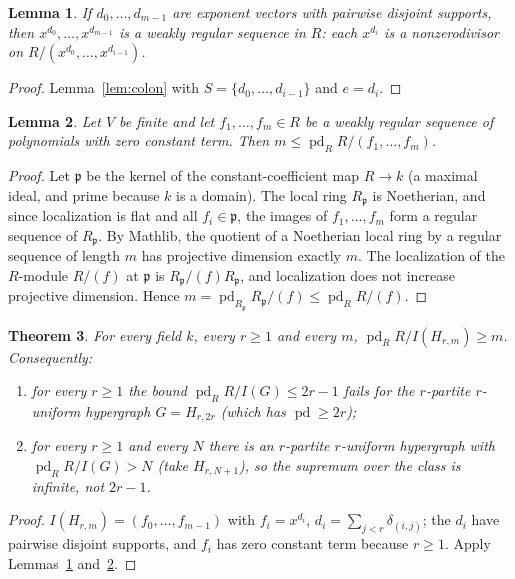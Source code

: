\documentclass[11pt]{article}
\newtheorem{theorem}{Theorem}
\newtheorem{lemma}[theorem]{Lemma}
\theoremstyle{definition}
\theoremstyle{remark}
\renewcommand{\_}{\oldus\allowbreak}
\newcommand{\pd}{\operatorname{pd}}
\begin{document}
\begin{lemma}\label{lem:reg}
If $d_0,\dots,d_{m-1}$ are exponent vectors with pairwise disjoint supports, then
$x^{d_0},\dots,x^{d_{m-1}}$ is a weakly regular sequence in $R$: each $x^{d_i}$ is a
nonzerodivisor on $R/(x^{d_0},\dots,x^{d_{i-1}})$.
\end{lemma}
\begin{proof}
Lemma~\ref{lem:colon} with $S=\{d_0,\dots,d_{i-1}\}$ and $e=d_i$.
\end{proof}

\begin{lemma}\label{lem:pd}
Let $V$ be finite and let $f_1,\dots,f_m\in R$ be a weakly regular sequence of polynomials with zero
constant term. Then $m\le\pd_R R/(f_1,\dots,f_m)$.
\end{lemma}
\begin{proof}
Let $\mathfrak p$ be the kernel of the constant-coefficient map $R\to k$ (a maximal ideal, and
prime because $k$ is a domain). The local ring $R_{\mathfrak p}$ is Noetherian, and since localization
is flat and all $f_i\in\mathfrak p$, the images of $f_1,\dots,f_m$ form a regular sequence of
$R_{\mathfrak p}$. By Mathlib, the quotient of a Noetherian local ring by a regular sequence of
length $m$ has projective dimension exactly $m$. The localization of the $R$-module $R/(f)$ at
$\mathfrak p$ is $R_{\mathfrak p}/(f)R_{\mathfrak p}$, and localization does not increase projective
dimension. Hence $m=\pd_{R_{\mathfrak p}}R_{\mathfrak p}/(f)\le \pd_R R/(f)$.
\end{proof}

\begin{theorem}\label{thm:main}
For every field $k$, every $r\ge 1$ and every $m$, $\pd_R R/I(H_{r,m})\ge m$. Consequently:
\begin{enumerate}[nosep]
\item[(A)] for every $r\ge 1$ the bound $\pd_R R/I(G)\le 2r-1$ fails for the $r$-partite
$r$-uniform hypergraph $G=H_{r,2r}$ (which has $\pd\ge 2r$);
\item[(B)] for every $r\ge 1$ and every $N$ there is an $r$-partite $r$-uniform hypergraph with
$\pd_R R/I(G)>N$ (take $H_{r,N+1}$), so the supremum over the class is infinite, not $2r-1$.
\end{enumerate}
\end{theorem}
\begin{proof}
$I(H_{r,m})=(f_0,\dots,f_{m-1})$ with $f_i=x^{d_i}$, $d_i=\sum_{j<r}\delta_{(i,j)}$; the $d_i$ have
pairwise disjoint supports, and $f_i$ has zero constant term because $r\ge1$. Apply
Lemmas~\ref{lem:reg} and~\ref{lem:pd}.
\end{proof}
\end{document}
